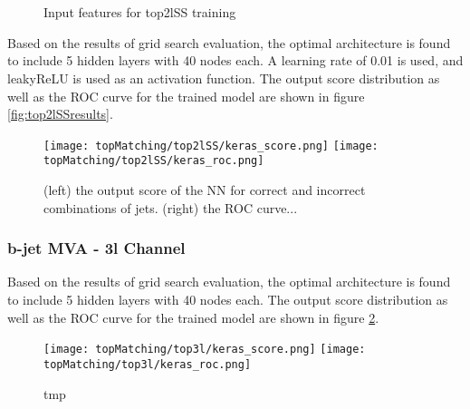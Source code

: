 \begin{figure}
    \\
    \\
    \caption{Input features for top2lSS training}
    \label{fig:features_top2lSS}
\end{figure}

Based on the results of grid search evaluation, the optimal architecture is found to include 5 hidden layers with 40 nodes each. A learning rate of 0.01 is used, and leakyReLU is used as an activation function. The output score distribution as well as the ROC curve for the trained model are shown in figure \ref{fig:top2lSSresults}.

\begin{figure}
  \texttt{[image: topMatching/top2lSS/keras\_score.png]}%
  \texttt{[image: topMatching/top2lSS/keras\_roc.png]}
  \caption{(left) the output score of the NN for correct and incorrect combinations of jets. (right) the ROC curve...}
\end{figure}

\subsubsection{b-jet MVA - 3l Channel}
\label{subsec:top3l}

Based on the results of grid search evaluation, the optimal architecture is found to include 5 hidden layers with 40 nodes each. The output score distribution as well as the ROC curve for the trained model are shown in figure \ref{fig:top3lresults}.

\begin{figure}
  \texttt{[image: topMatching/top3l/keras\_score.png]}%
  \texttt{[image: topMatching/top3l/keras\_roc.png]}
  \label{fig:top3lresults}
  \caption{tmp}
\end{figure}

